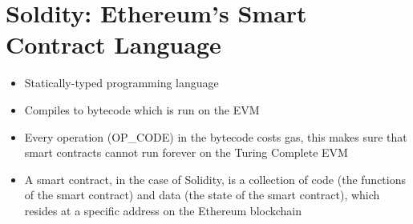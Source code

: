 \section{Soldity: Ethereum's Smart Contract Language}
\begin{itemize}
	\item Statically-typed programming language
	\item Compiles to bytecode which is run on the EVM
	\item Every operation (OP\_CODE) in the bytecode costs gas, this makes sure that smart contracts cannot run forever on the Turing Complete EVM
	\item A smart contract, in the case of Solidity, is a collection of code (the functions of the smart contract) and data (the state of the smart contract), which resides at a specific address on the Ethereum blockchain
\end{itemize}